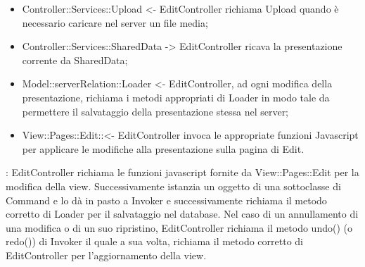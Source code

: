 {{\begin{itemize}
\begin{itemize}
				\item ConcreteImageRemoveCommand <- EditController costruisce un comando e lo dà in pasto a Invoker;
				\item ConcreteSVGRemoveCommand <- EditController costruisce un comando e lo dà in pasto a Invoker;
				\item ConcreteAudioRemoveCommand <- EditController costruisce un comando e lo dà in pasto a Invoker;
				\item ConcreteVideoRemoveCommand <- EditController costruisce un comando e lo dà in pasto a Invoker;
				\item ConcreteBackgroundRemoveCommand <- EditController costruisce un comando e lo dà in pasto a Invoker;
				\item ConcreteEditSizeCommand <- EditController costruisce un comando e lo dà in pasto a Invoker;
				\item ConcreteEditPositionCommand <- EditController costruisce un comando e lo dà in pasto a Invoker;
				\item ConcreteEditRotationCommand <- EditController costruisce un comando e lo dà in pasto a Invoker;
				\item ConcreteEditColorCommand <- EditController costruisce un comando e lo dà in pasto a Invoker;
				\item ConcreteEditBackgroundCommand <- EditController costruisce un comando e lo dà in pasto a Invoker;
				\item ConcreteEditFontCommand <- EditController costruisce un comando e lo dà in pasto a Invoker;
				\item ConcreteEditContentCommand <- EditController costruisce un comando e lo dà in pasto a Invoker;
			\end{itemize}
			\item Controller::\-Services::\-Upload <- EditController richiama Upload quando è necessario caricare nel server un file media;
			\item Controller::\-Services::\-SharedData -> EditController ricava la presentazione corrente da SharedData;

			\item Model::\-serverRelation::\-Loader <- EditController, ad ogni modifica della presentazione, richiama i metodi appropriati di Loader in modo tale da permettere il salvataggio della presentazione stessa nel server;

			\item View::\-Pages::\-Edit:: <- EditController invoca le appropriate funzioni Javascript per applicare le modifiche alla presentazione sulla pagina di Edit.
		\end{itemize} 
		\textbf{\interfacce}: EditController richiama le funzioni javascript fornite da View::\-Pages::\-Edit per la modifica della view. Successivamente istanzia un oggetto di una sottoclasse di Command e lo dà in pasto a Invoker e successivamente richiama il metodo corretto di Loader per il salvataggio nel database. Nel caso di un annullamento di una modifica o di un suo ripristino, EditController richiama il metodo undo() (o redo()) di Invoker il quale a sua volta, richiama il metodo corretto di EditController per l'aggiornamento della view.
	}
		
}
